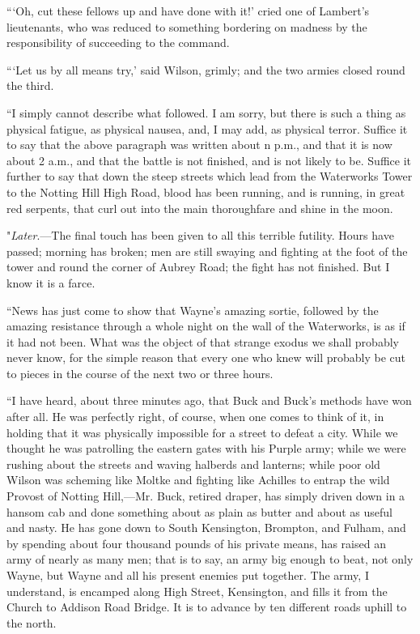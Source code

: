 \documentclass{book}
\begin{document}
“‘Oh, cut these fellows up and have done with it!’ cried one of Lambert’s lieutenants, who was reduced to something bordering on madness by the responsibility of succeeding to the command.

“‘Let us by all means try,’ said Wilson, grimly; and the two armies closed round the third.

“I simply cannot describe what followed. I am sorry, but there is such a thing as physical fatigue, as physical nausea, and, I may add, as physical terror. Suffice it to say that the above paragraph was written about n p.m., and that it is now about 2 a.m., and that the battle is not finished, and is not likely to be. Suffice it further to say that down the steep streets which lead from the Waterworks Tower to the Notting Hill High Road, blood has been running, and is running, in great red serpents, that curl out into the main thoroughfare and shine in the moon.

"\emph{Later}.—The final touch has been given to all this terrible futility. Hours have passed; morning has broken; men are still swaying and fighting at the foot of the tower and round the corner of Aubrey Road; the fight has not finished. But I know it is a farce.

“News has just come to show that Wayne’s amazing sortie, followed by the amazing resistance through a whole night on the wall of the Waterworks, is as if it had not been. What was the object of that strange exodus we shall probably never know, for the simple reason that every one who knew will probably be cut to pieces in the course of the next two or three hours.

“I have heard, about three minutes ago, that Buck and Buck’s methods have won after all. He was perfectly right, of course, when one comes to think of it, in holding that it was physically impossible for a street to defeat a city. While we thought he was patrolling the eastern gates with his Purple army; while we were rushing about the streets and waving halberds and lanterns; while poor old Wilson was scheming like Moltke and fighting like Achilles to entrap the wild Provost of Notting Hill,—Mr. Buck, retired draper, has simply driven down in a hansom cab and done something about as plain as butter and about as useful and nasty. He has gone down to South Kensington, Brompton, and Fulham, and by spending about four thousand pounds of his private means, has raised an army of nearly as many men; that is to say, an army big enough to beat, not only Wayne, but Wayne and all his present enemies put together. The army, I understand, is encamped along High Street, Kensington, and fills it from the Church to Addison Road Bridge. It is to advance by ten different roads uphill to the north.
\end{document}
